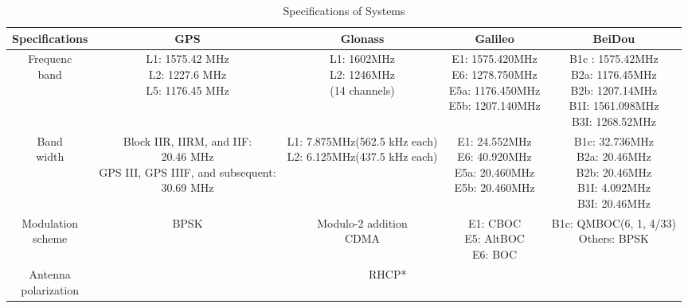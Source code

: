 \begin{landscape}
\begin{center}
\begin{table}
    \centering
    \caption{Specifications of Systems}\label{tab:spec_gnss}
    \begin{tabular}{ccccc}
    \toprule
    Specifications & GPS & Glonass & Galileo & BeiDou\\
    \midrule
    \thead{Frequenc\\band} & \thead{L1: 1575.42 MHz\\L2: 1227.6 MHz\\L5: 1176.45 MHz} & \thead{L1: 1602MHz\\L2: 1246MHz\\(14 channels)} & \thead{E1: 1575.420MHz\\E6: 1278.750MHz\\E5a: 1176.450MHz\\E5b: 1207.140MHz} & \thead{B1c : 1575.42MHz\\B2a: 1176.45MHz\\B2b: 1207.14MHz\\B1I: 1561.098MHz\\B3I: 1268.52MHz}\\
    \thead{Band\\width} & \thead{Block IIR, IIRM, and IIF:\\20.46 MHz\\GPS III, GPS IIIF, and subsequent:\\30.69 MHz} & \thead{L1: 7.875MHz(562.5 kHz each)\\L2: 6.125MHz(437.5 kHz each)} & \thead{E1: 24.552MHz\\E6: 40.920MHz\\E5a: 20.460MHz\\E5b: 20.460MHz} & \thead{B1c: 32.736MHz\\B2a: 20.46MHz\\B2b: 20.46MHz\\B1I: 4.092MHz\\B3I: 20.46MHz}\\
    \thead{Modulation\\scheme} & BPSK & \thead{Modulo-2 addition\\CDMA}& \thead{E1: CBOC\\E5: AltBOC\\E6: BOC} & \thead{B1c: QMBOC(6, 1, 4/33)\\Others: BPSK}\\
    \thead{Antenna\\polarization} & \multicolumn{4}{c}{RHCP*}\\

\end{tabular}
\end{table}
\end{center}
\end{landscape}
